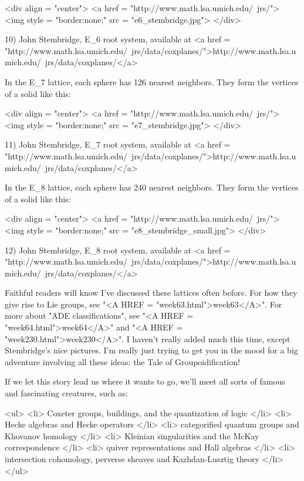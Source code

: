 <div align = "center">
<a href = "http://www.math.lsa.umich.edu/~jrs/">
<img style = "border:none;" src = "e6_stembridge.jpg">
</div>

10) John Stembridge, E_{6} root system, available at
<a href = "http://www.math.lsa.umich.edu/~jrs/data/coxplanes/">http://www.math.lsa.umich.edu/~jrs/data/coxplanes/</a>

In the E_{7} lattice, each sphere has 126 nearest neighbors.  They form
the vertices of a solid like this:

<div align = "center">
<a href = "http://www.math.lsa.umich.edu/~jrs/">
<img style = "border:none;" src = "e7_stembridge.jpg">
</div>

11) John Stembridge, E_{7} root system, available at
<a href = "http://www.math.lsa.umich.edu/~jrs/data/coxplanes/">http://www.math.lsa.umich.edu/~jrs/data/coxplanes/</a>


In the E_{8} lattice, each sphere has 240 nearest neighbors.  They form
the vertices of a solid like this:

<div align = "center">
<a href = "http://www.math.lsa.umich.edu/~jrs/">
<img style = "border:none;" src = "e8_stembridge_small.jpg">
</div>

12) John Stembridge, E_{8} root system, available at
<a href = "http://www.math.lsa.umich.edu/~jrs/data/coxplanes/">http://www.math.lsa.umich.edu/~jrs/data/coxplanes/</a>


Faithful readers will know I've discussed these lattices often before.
For how they give rise to Lie groups, see "<A HREF =
"week63.html">week63</A>".  For more about "ADE
classifications", see "<A HREF =
"week64.html">week64</A>" and "<A HREF =
"week230.html">week230</A>".  I haven't really added much this
time, except Stembridge's nice pictures.  I'm really just trying to
get you in the mood for a big adventure involving all these ideas: the
Tale of Groupoidification!

If we let this story lead us where it wants to go, we'll meet 
all sorts of famous and fascinating creatures, such as:

<ul>
<li>
 Coxeter groups, buildings, and the quantization of logic  
</li>
<li>
 Hecke algebras and Hecke operators 
</li>
<li>
 categorified quantum groups and Khovanov homology 
</li>
<li>
 Kleinian singularities and the McKay correspondence 
</li>
<li>
 quiver representations and Hall algebras 
</li>
<li>
 intersection cohomology, perverse sheaves and Kazhdan-Lusztig theory 
</li>
</ul>


